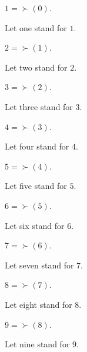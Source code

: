 \documentclass[../../arithmetic.tex]{subfiles}
\begin{document}
  \begin{forthel}
    \begin{definition}
      $1 = \succ(0)$.
    \end{definition}

    Let one stand for $1$.

    \begin{definition}
      $2 = \succ(1)$.
    \end{definition}

    Let two stand for $2$.

    \begin{definition}
      $3 = \succ(2)$.
    \end{definition}

    Let three stand for $3$.

    \begin{definition}
      $4 = \succ(3)$.
    \end{definition}

    Let four stand for $4$.

    \begin{definition}
      $5 = \succ(4)$.
    \end{definition}

    Let five stand for $5$.

    \begin{definition}
      $6 = \succ(5)$.
    \end{definition}

    Let six stand for $6$.

    \begin{definition}
      $7 = \succ(6)$.
    \end{definition}

    Let seven stand for $7$.

    \begin{definition}
      $8 = \succ(7)$.
    \end{definition}

    Let eight stand for $8$.

    \begin{definition}
      $9 = \succ(8)$.
    \end{definition}

    Let nine stand for $9$.
  \end{forthel}
\end{document}

